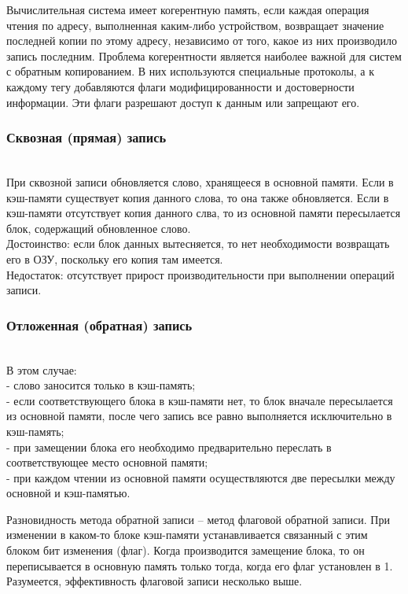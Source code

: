 \documentclass[13pt]{article}
\begin{document}
Вычислительная система имеет когерентную память, если каждая операция чтения по адресу, выполненная каким-либо устройством, возвращает значение последней копии по этому адресу, независимо от того, какое из них производило запись последним. Проблема когерентности является наиболее важной для систем с обратным копированием. В них используются специальные протоколы, а к каждому тегу добавляются флаги модифицированности и достоверности информации. Эти флаги разрешают доступ к данным или запрещают его.
	\subsubsection{Сквозная (прямая) запись}\\
    При сквозной записи обновляется слово, хранящееся в основной памяти. Если в кэш-памяти существует копия данного слова, то она также обновляется. Если в кэш-памяти отсутствует копия данного слва, то из основной памяти пересылается блок, содержащий обновленное слово.\\
    Достоинство: если блок данных вытесняется, то нет необходимости возвращать его в ОЗУ, поскольку его копия там имеется.\\
    Недостаток: отсутствует прирост производительности при выполнении операций записи.
	\subsubsection{Отложенная (обратная) запись}\\
	В этом случае:\\
        - слово заносится только в кэш-память; \\
        - если соответствующего блока в кэш-памяти нет, то блок вначале пересылается из основной памяти, после чего запись все равно выполняется исключительно в кэш-память; \\
        - при замещении блока его необходимо предварительно переслать в соответствующее место основной памяти; \\
        - при каждом чтении из основной памяти осуществляются две пересылки между основной и кэш-памятью. 

Разновидность метода обратной записи – метод флаговой обратной записи. При изменении в каком-то блоке кэш-памяти устанавливается связанный с этим блоком бит изменения (флаг). Когда производится замещение блока, то он переписывается в основную память только тогда, когда его флаг установлен в 1. Разумеется, эффективность флаговой записи несколько выше. \cite{book:33863}
	\newpage
\end{document}
